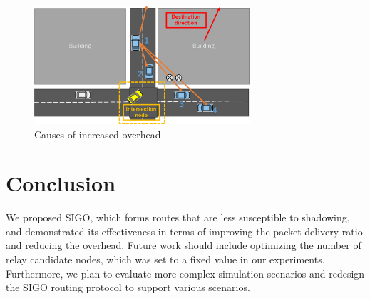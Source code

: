 \documentclass[conference]{IEEEtran}
\begin{document}
\begin{figure}[!ht]
\centering
\includegraphics[width=80mm]{figures/overhead_reason.eps}
\caption{Causes of increased overhead}
\label{fig:overhead_reason}
\end{figure}



\section{Conclusion}
\label{conclusion}
We proposed SIGO, which forms routes that are less susceptible to shadowing, and demonstrated its effectiveness in terms of improving the packet delivery ratio and reducing the overhead. 
Future work should include optimizing the number of relay candidate nodes, which was set to a fixed value in  our experiments. 
Furthermore, we plan to evaluate more complex simulation scenarios and redesign the SIGO routing protocol to support  various scenarios.





\end{document}
